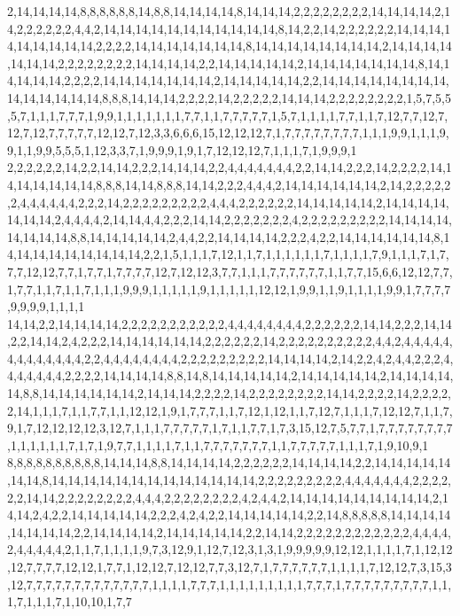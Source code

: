 2,14,14,14,14,8,8,8,8,8,8,14,8,8,14,14,14,14,8,14,14,14,2,2,2,2,2,2,2,2,14,14,14,14,2,14,2,2,2,2,2,2,4,4,2,14,14,14,14,14,14,14,14,14,14,14,8,14,2,2,14,2,2,2,2,2,2,14,14,14,14,14,14,14,14,14,2,2,2,2,14,14,14,14,14,14,14,8,14,14,14,14,14,14,14,14,2,14,14,14,14,14,14,14,2,2,2,2,2,2,2,2,14,14,14,14,2,2,14,14,14,14,14,2,14,14,14,14,14,14,14,8,14,14,14,14,14,2,2,2,2,14,14,14,14,14,14,14,2,14,14,14,14,14,2,2,14,14,14,14,14,14,14,14,14,14,14,14,14,14,8,8,8,14,14,14,2,2,2,2,14,2,2,2,2,2,14,14,14,2,2,2,2,2,2,2,2,1,5,7,5,5,5,7,1,1,1,7,7,7,1,9,9,1,1,1,1,1,1,1,7,7,1,1,7,7,7,7,7,1,5,7,1,1,1,1,7,7,1,1,7,12,7,7,12,7,12,7,12,7,7,7,7,7,12,12,7,12,3,3,6,6,6,15,12,12,12,7,1,7,7,7,7,7,7,7,7,1,1,1,9,9,1,1,1,9,9,1,1,9,9,5,5,5,1,12,3,3,7,1,9,9,9,1,9,1,7,12,12,12,7,1,1,1,7,1,9,9,9,1
2,2,2,2,2,2,14,2,2,14,14,2,2,2,14,14,14,2,2,4,4,4,4,4,4,4,2,2,14,14,2,2,2,14,2,2,2,2,14,14,14,14,14,14,14,8,8,8,14,14,8,8,8,14,14,2,2,2,4,4,4,2,14,14,14,14,14,14,2,14,2,2,2,2,2,2,4,4,4,4,4,4,2,2,2,14,2,2,2,2,2,2,2,2,2,4,4,4,2,2,2,2,2,2,14,14,14,14,14,2,14,14,14,14,14,14,14,2,4,4,4,4,2,14,14,4,4,2,2,2,14,14,2,2,2,2,2,2,2,4,2,2,2,2,2,2,2,2,2,14,14,14,14,14,14,14,14,8,8,14,14,14,14,14,2,4,4,2,2,14,14,14,14,2,2,2,4,2,2,14,14,14,14,14,14,8,14,14,14,14,14,14,14,14,14,2,2,1,5,1,1,1,7,12,1,1,7,1,1,1,1,1,1,7,1,1,1,1,7,9,1,1,1,7,1,7,7,7,12,12,7,7,1,7,7,1,7,7,7,7,12,7,12,12,3,7,7,1,1,1,7,7,7,7,7,7,1,1,7,7,15,6,6,12,12,7,7,1,7,7,1,1,7,1,1,7,1,1,1,9,9,9,1,1,1,1,1,9,1,1,1,1,1,12,12,1,9,9,1,1,9,1,1,1,1,9,9,1,7,7,7,7,9,9,9,9,1,1,1,1
14,14,2,2,14,14,14,14,2,2,2,2,2,2,2,2,2,2,2,4,4,4,4,4,4,4,4,2,2,2,2,2,2,14,14,2,2,2,14,14,2,2,14,14,2,4,2,2,2,14,14,14,14,14,14,2,2,2,2,2,2,14,2,2,2,2,2,2,2,2,2,2,4,4,2,4,4,4,4,4,4,4,4,4,4,4,4,4,2,2,4,4,4,4,4,4,4,4,2,2,2,2,2,2,2,2,2,14,14,14,14,2,14,2,2,4,2,4,4,2,2,2,4,4,4,4,4,4,4,2,2,2,2,14,14,14,14,8,8,14,8,14,14,14,14,14,2,14,14,14,14,14,2,14,14,14,14,14,8,8,14,14,14,14,14,14,2,14,14,14,2,2,2,2,14,2,2,2,2,2,2,2,2,14,14,2,2,2,2,14,2,2,2,2,2,14,1,1,1,7,1,1,7,7,1,1,12,12,1,9,1,7,7,7,1,1,7,12,1,12,1,1,7,12,7,1,1,1,7,12,12,7,1,1,7,9,1,7,12,12,12,12,3,12,7,1,1,1,7,7,7,7,7,1,7,1,1,7,7,1,7,3,15,12,7,5,7,7,1,7,7,7,7,7,7,7,7,1,1,1,1,1,1,7,1,7,1,9,7,7,1,1,1,1,7,1,1,7,7,7,7,7,7,7,1,1,7,7,7,7,7,1,1,1,7,1,9,10,9,1
8,8,8,8,8,8,8,8,8,8,14,14,14,8,8,14,14,14,14,2,2,2,2,2,2,14,14,14,14,2,2,14,14,14,14,14,14,14,8,14,14,14,14,14,14,14,14,14,14,14,14,14,2,2,2,2,2,2,2,2,2,4,4,4,4,4,4,4,2,2,2,2,2,2,14,14,2,2,2,2,2,2,2,2,4,4,4,2,2,2,2,2,2,2,2,4,2,4,4,2,14,14,14,14,14,14,14,14,14,2,14,14,2,4,2,2,14,14,14,14,14,2,2,2,4,2,4,2,2,14,14,14,14,14,2,2,14,8,8,8,8,8,14,14,14,14,14,14,14,14,2,2,14,14,14,14,2,14,14,14,14,14,2,2,14,14,2,2,2,2,2,2,2,2,2,2,2,2,4,4,4,4,2,4,4,4,4,4,2,1,1,7,1,1,1,1,9,7,3,12,9,1,12,7,12,3,1,3,1,9,9,9,9,9,12,12,1,1,1,1,7,1,12,12,12,7,7,7,7,12,12,1,7,7,1,12,12,7,12,12,7,7,3,12,7,1,7,7,7,7,7,7,1,1,1,1,7,12,12,7,3,15,3,12,7,7,7,7,7,7,7,7,7,7,7,7,7,1,1,1,1,7,7,7,1,1,1,1,1,1,1,1,1,7,7,7,1,7,7,7,7,7,7,7,7,7,1,1,1,7,1,1,1,7,1,10,10,1,7,7
